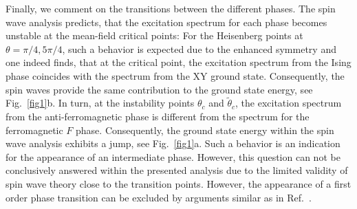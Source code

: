 Finally, we comment on the transitions between the different phases. The spin wave analysis predicts, 
that the excitation spectrum for each phase becomes unstable at the mean-field critical points: For the Heisenberg 
points at $\theta = \pi/4, 5\pi/4$, such a behavior is expected due to the enhanced symmetry and one indeed finds, 
that at the critical point, the excitation spectrum from the Ising phase coincides with the spectrum from the XY ground state.   
Consequently, the spin waves provide the same  contribution to the ground state energy, see Fig.~\ref{fig1}b. In turn, at the instability points 
$\theta_{c}$ and $\tilde{\theta}_{c}$, the excitation spectrum from the anti-ferromagnetic phase is different from the spectrum for the ferromagnetic $F$ phase.
Consequently, the ground state energy within the spin wave analysis exhibits a jump, see Fig.~\ref{fig1}a. Such a behavior is an indication 
for the appearance of an intermediate phase. However,  this question can not be conclusively answered within the presented analysis due to  the limited validity of spin wave theory close to the transition points. However, the appearance of a first order phase transition can be excluded by arguments similar as in
Ref.~\cite{spivak04}.

